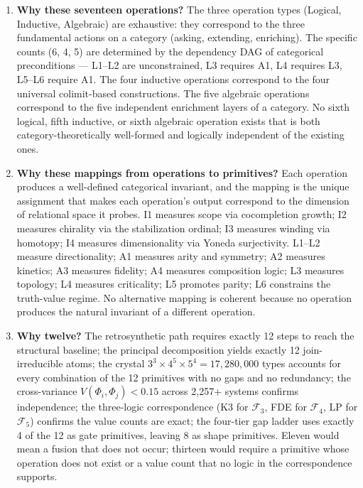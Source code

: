 \documentclass[12pt,a4paper]{article}
\makeatletter
\renewcommand{\_}{\ig@origunderscore\discretionary{}{}{}}
\makeatother
\begin{document}
\begin{enumerate}
 \item \textbf{Why these seventeen operations?} The three operation types (Logical, Inductive, Algebraic) are
exhaustive: they correspond to the three fundamental actions on a category (asking, extending, enriching). The specific
counts (6, 4, 5) are determined by the dependency DAG of categorical preconditions --- L1--L2 are unconstrained, L3
requires A1, L4 requires L3, L5--L6 require A1. The four inductive operations correspond to the four universal
colimit-based constructions. The five algebraic operations correspond to the five independent enrichment layers of a
category. No sixth logical, fifth inductive, or sixth algebraic operation exists that is both category-theoretically
well-formed and logically independent of the existing ones.
 \item \textbf{Why these mappings from operations to primitives?} Each operation produces a well-defined categorical
invariant, and the mapping is the unique assignment that makes each operation's output correspond to the dimension of
relational space it probes. I1 measures scope via cocompletion growth; I2 measures chirality via the stabilization ordinal;
I3 measures winding via homotopy; I4 measures dimensionality via Yoneda surjectivity. L1--L2 measure directionality; A1
measures arity and symmetry; A2 measures kinetics; A3 measures fidelity; A4 measures composition logic; L3 measures
topology; L4 measures criticality; L5 promotes parity; L6 constrains the truth-value regime. No alternative mapping is
coherent because no operation produces the natural invariant of a different operation.
 \item \textbf{Why twelve?} The retrosynthetic path requires exactly 12 steps to reach the structural baseline; the
principal decomposition yields exactly 12 join-irreducible atoms; the crystal $3^3 \times 4^5 \times 5^4 = 17{,}280{,}000$ types accounts for every combination of the 12 primitives with no gaps and no redundancy; the
cross-variance $V(\Phi_i,\Phi_j) < 0.15$ across 2,257+ systems confirms independence; the three-logic correspondence
(K3 for $\mathcal{F}_3$, FDE for $\mathcal{F}_4$, LP for $\mathcal{F}_5$) confirms the value counts are exact; the
four-tier gap ladder uses exactly 4 of the 12 as gate primitives, leaving 8 as shape primitives. Eleven would mean a
fusion that does not occur; thirteen would require a primitive whose operation does not exist or a value count that no logic in the correspondence supports.
\end{enumerate}
\end{document}
